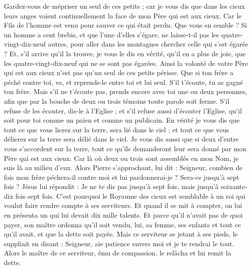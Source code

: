\begin{multicols}{2}
Gardez-vous de mépriser un seul de ces petits ; car je vous dis que dans les cieux leurs anges voient continuellement la face de mon Père qui est aux cieux.
Car le Fils de l'homme est venu pour sauver ce qui était perdu.
Que vous en semble ? Si un homme a cent brebis, et que l’une d’elles s’égare, ne laisse-t-il pas les quatre-vingt-dix-neuf autres, pour aller dans les montagnes chercher celle qui s'est égarée ?
Et, s'il arrive qu'il la trouve, je vous le dis en vérité, qu’il en a plus de joie, que les quatre-vingt-dix-neuf qui ne se sont pas égarées.
Ainsi la volonté de votre Père qui est aux cieux n’est pas qu’un seul de ces petits périsse.
Que si ton frère a péché contre toi, va, et reprends-le entre toi et lui seul. S’il t'écoute, tu as gagné ton frère.
Mais s'il ne t'écoute pas, prends encore avec toi une ou deux personnes, afin que par la bouche de deux ou trois témoins toute parole soit ferme.
S’il refuse de les écouter, dis-le à l'Eglise ; et s'il refuse aussi d’écouter l'Eglise, qu'il soit pour toi comme un païen et comme un publicain.
En vérité je vous dis que tout ce que vous lierez sur la terre, sera lié dans le ciel ; et tout ce que vous délierez sur la terre sera délié dans le ciel.
Je vous dis aussi que si deux d'entre vous s'accordent sur la terre, tout ce qu’ils demanderont leur sera donné par mon Père qui est aux cieux.
Car là où deux ou trois sont assemblés en mon Nom, je suis là au milieu d'eux.
Alors Pierre s'approchant, lui dit : Seigneur, combien de fois mon frère péchera-il contre moi et lui pardonnerai-je ? Sera-ce jusqu’à sept fois ?
Jésus lui répondit : Je ne te dis pas jusqu'à sept fois, mais jusqu'à soixante-dix fois sept fois.
C'est pourquoi le Royaume des cieux est semblable à un roi qui voulut faire rendre compte à ses serviteurs.
Et quand il se mit à compter, on lui en présenta un qui lui devait dix mille talents.
Et parce qu'il n'avait pas de quoi payer, son maître ordonna qu'il soit vendu, lui, sa femme, ses enfants et tout ce qu'il avait, et que la dette soit payée.
Mais ce serviteur se jetant à ses pieds, le suppliait en disant : Seigneur, aie patience envers moi et je te rendrai le tout.
Alors le maître de ce serviteur, ému de compassion, le relâcha et lui remit la dette.

\end{multicols}
